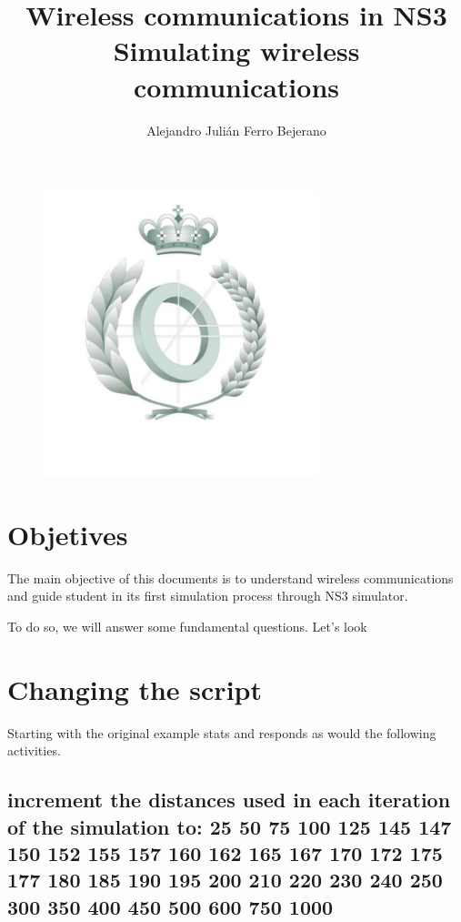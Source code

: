 \documentclass[a4paper,10pt]{article}
\title{\textbf{ Wireless communications
in NS3}\\ Simulating wireless communications}
\author{Alejandro Juli\'an Ferro Bejerano}
\begin{document}
\maketitle

\begin{figure}[!h]
\centering
   \includegraphics[width=8cm]{escudo_esi.jpg}
\end{figure}

\newpage

\tableofcontents

\newpage

\section{Objetives}

The main objective of this documents is to understand wireless communications and guide student in
its first simulation process through NS3 simulator.

\singlespacing
To do so, we will answer some fundamental questions. Let's look

\section{Changing the script}
Starting with the original example stats and responds as would the following activities.

\subsection{increment the distances used in each iteration of the simulation to: 25 50 75 100 125 145 147
150 152 155 157 160 162 165 167 170 172 175 177 180 185 190 195 200 210 220 230 240 250
300 350 400 450 500 600 750 1000}
\end{document}
